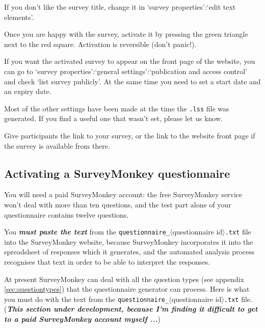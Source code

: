 \documentclass[11pt,a4paper]{article}
\newcommand{\seclabel}[1]{\label{sec:#1}}
\newcommand{\appxref}[1]{appendix \ref{sec:#1}}
\begin{document}
If you don't like the survey title, change it in `survey properties':`edit text elements'.

Once you are happy with the survey, activate it by pressing the green triangle next to the red square. Activation is reversible (don't panic!). 

If you want the activated survey to appear on the front page of the website, you can go to `survey properties':`general settings':`publication and access control' and check `list survey publicly'. At the same time you need to set a start date and an expiry date.

Most of the other settings have been made at the time the \texttt{.lss} file was generated. If you find a useful one that wasn't set, please let us know.

Give participants the link to your survey, or the link to the website front page if the survey is available from there.

\subsection{Activating a SurveyMonkey questionnaire}
\seclabel{runningSurveyMonkey}

You will need a paid SurveyMonkey account: the free SurveyMonkey service won't deal with more than ten questions, and the test part alone of your questionnaire contains twelve questions.

You \textbf{\textit{must paste the text}} from the \texttt{questionnaire\_}$\langle$questionnaire id$\rangle$\texttt{.txt} file into the SurveyMonkey website, because SurveyMonkey incorporates it into the spreadsheet of responses which it generates, and the automated analysis process recognises that text in order to be able to interpret the responses.

At present SurveyMonkey can deal with all the question types (see \appxref{questiontypes}) that the questionnaire generator can process. Here is what you must do with the text from the \texttt{questionnaire\_}$\langle$questionnaire id$\rangle$\texttt{.txt} file. (\textbf{\textit{This section under development, because I'm finding it difficult to get to a paid SurveyMonkey account myself ...}})
\end{document}
